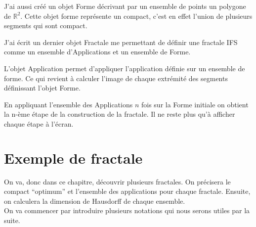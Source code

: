 \documentclass[a4paper, 12pt]{report}
\begin{document}
			\vspace{.2 cm}\hspace{.7 cm}
			J'ai aussi créé un objet Forme décrivant par un ensemble de points un polygone de $\mathds{R}^2$. Cette objet forme représente un compact, c'est en effet l'union de plusieurs segments qui sont compact.
			
			\vspace{.2 cm}\hspace{.7 cm}
			J'ai écrit un dernier objet Fractale me permettant de définir une fractale IFS comme un ensemble d'Applications et un ensemble de Forme.
			
			\vspace{.2 cm}\hspace{.7 cm}
			L'objet Application permet d'appliquer l'application définie sur un ensemble de forme. Ce qui revient à calculer l'image de chaque extrémité des segments définissant l'objet Forme.
	
			\vspace{.2 cm}\hspace{.7 cm}
			En appliquant l'ensemble des Applications $n$ fois sur la Forme initiale on obtient la n-ème étape de la construction de la fractale. Il ne reste plus qu'à afficher chaque étape à l'écran.
	
	
	
	\chapter{\bf Exemple de fractale}
		On va, donc dans ce chapitre, découvrir plusieurs fractales. On précisera le compact ``optimum'' et l'ensemble des applications pour chaque fractale. Ensuite, on calculera la dimension de Hausdorff de chaque ensemble.\\
		On va commencer par introduire plusieurs notations qui nous serons utiles par la suite.
\end{document}
